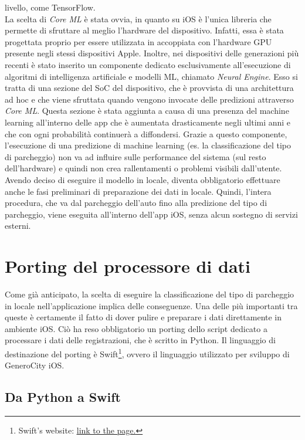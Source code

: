 livello, come TensorFlow.\\
La scelta di \emph{Core ML} è stata ovvia, in quanto su iOS è l'unica
libreria che permette di sfruttare al meglio l'hardware del dispositivo.
Infatti, essa è stata progettata proprio per essere utilizzata in
accoppiata con l'hardware GPU presente negli stessi dispositivi Apple.
Inoltre, nei dispositivi delle generazioni più recenti è stato inserito
un componente dedicato esclusivamente all'esecuzione di algoritmi di
intelligenza artificiale e modelli ML, chiamato \emph{Neural Engine}.
Esso si tratta di una sezione del SoC del dispositivo, che è provvista di una 
architettura ad hoc e che viene sfruttata quando vengono invocate delle
predizioni attraverso \emph{Core ML}. Questa sezione è stata aggiunta 
a causa di una presenza del machine learning all'interno delle app
che è aumentata drasticamente negli ultimi anni e che con ogni
probabilità continuerà a diffondersi. Grazie a questo componente,
l'esecuzione di una predizione di machine learning (es. la 
classificazione del tipo di parcheggio) non va ad influire sulle
performance del sistema (sul resto dell'hardware) e quindi non 
crea rallentamenti o problemi visibili dall'utente.\\
Avendo deciso di eseguire il modello in locale, diventa obbligatorio
effettuare anche le fasi preliminari di preparazione dei dati in 
locale. Quindi, l'intera procedura, che va dal parcheggio 
dell'auto fino alla predizione del tipo di parcheggio, viene
eseguita all'interno dell'app iOS, senza alcun sostegno di 
servizi esterni.

\section{Porting del processore di dati}

Come già anticipato, la scelta di eseguire la classificazione del tipo di
parcheggio in locale nell'applicazione implica delle conseguenze.
Una delle più importanti tra queste è certamente il fatto di dover
pulire e preparare i dati direttamente in ambiente iOS. Ciò
ha reso obbligatorio un porting dello script dedicato a processare i
dati delle registrazioni, che è scritto in Python. Il linguaggio di 
destinazione del porting è Swift\footnote{
Swift's website: 
\href{https://swift.org}{\underline{link to the page.}}}, ovvero il linguaggio utilizzato
per sviluppo di GeneroCity iOS.

\subsection{Da Python a Swift}

